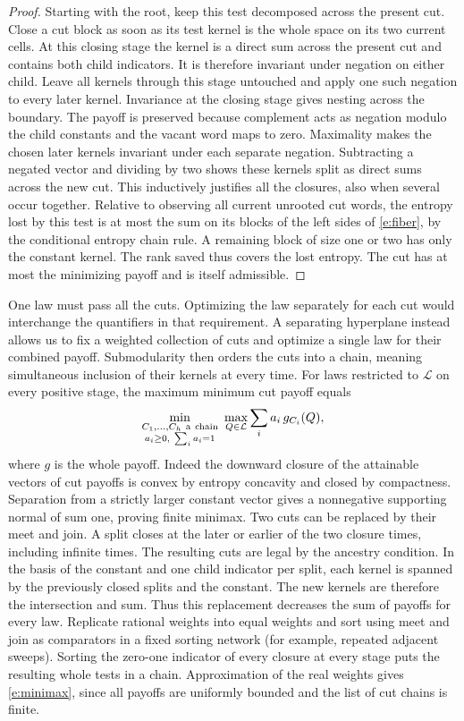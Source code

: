 \documentclass[11pt]{article}
\numberwithin{equation}{section}
\begin{document}
\begin{proof}
Starting with the root, keep this test decomposed across the
present cut. Close a cut block as soon as its test kernel is the
whole space on its two current cells. At this closing stage
the kernel is a direct sum across the present cut and contains
both child indicators. It is therefore invariant under negation
on either child. Leave all kernels through this stage untouched
and apply one such negation to every later kernel. Invariance at
the closing stage gives nesting across the boundary. The payoff
is preserved because complement acts as negation modulo the
child constants and the vacant word maps to zero. Maximality
makes the chosen later kernels invariant
under each separate negation. Subtracting a negated vector and
dividing by two shows these kernels split as direct sums across
the new cut. This inductively justifies all the closures, also when
several occur together. Relative to observing all current unrooted
cut words, the entropy lost by this test is at most the sum on its
blocks of the left sides of \eqref{e:fiber}, by the conditional
entropy chain rule. A remaining block of size one or two has only
the constant kernel. The rank saved thus covers the lost entropy.
The cut has at most the minimizing payoff and is itself admissible.
\end{proof}

One law must pass all the cuts. Optimizing the law separately
for each cut would interchange the quantifiers in that requirement.
A separating hyperplane instead allows us to fix a weighted
collection of cuts and optimize a single law for their combined
payoff. Submodularity then orders the cuts into a chain, meaning
simultaneous inclusion of their kernels at every time.
For laws restricted to $\mathcal L$ on every positive stage,
the maximum minimum cut payoff equals
\begin{equation}
 \min_{\substack{C_1,\ldots,C_h\ {\rm a\ chain}\\
                       a_i\ge0,\ \sum_i a_i=1}}
     \ \max_{Q\in\mathcal L}\sum_i a_i\,g_{C_i}(Q),
 \label{e:minimax}
\end{equation}
where $g$ is the whole payoff. Indeed the downward closure of
the attainable vectors of cut payoffs is convex by entropy
concavity and closed by compactness. Separation from a strictly
larger constant vector gives a nonnegative supporting normal of
sum one, proving finite minimax. Two cuts can be replaced by
their meet and join. A split closes at the later or earlier of the
two closure times, including infinite times. The resulting cuts
are legal by the ancestry condition. In the basis of the constant and one child indicator per split,
each kernel is spanned by the previously closed splits and the
constant. The new kernels are therefore the intersection and sum. Thus this replacement decreases
the sum of payoffs for every law. Replicate rational weights into
equal weights and sort using meet and join as comparators in a
fixed sorting network (for example, repeated adjacent sweeps).
Sorting the zero-one indicator of every closure at every stage
puts the resulting whole tests in a chain. Approximation of the real
weights gives \eqref{e:minimax}, since all payoffs are uniformly
bounded and the list of cut chains is finite.
\end{document}
